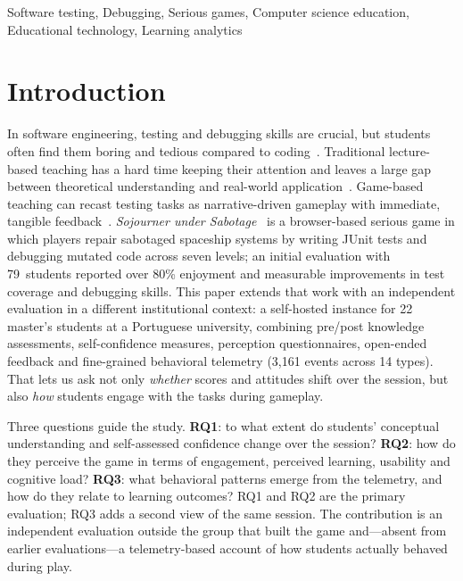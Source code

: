\documentclass[conference]{IEEEtran}
\begin{document}
\begin{IEEEkeywords}
Software testing, Debugging, Serious games, Computer science education, Educational technology, Learning analytics
\end{IEEEkeywords}

\section{Introduction}
\label{sec:intro}
In software engineering, testing and debugging skills are crucial, but students often find them boring and tedious compared to coding~\cite{straubinger2023survey, garousi2020testing}. Traditional lecture-based teaching has a hard time keeping their attention and leaves a large gap between theoretical understanding and real-world application~\cite{mccauley2008debugging}. Game-based teaching can recast testing tasks as narrative-driven gameplay with immediate, tangible feedback~\cite{connolly2012systematic, blanco2023gamification}.
\emph{Sojourner under Sabotage}~\cite{straubinger2025sojourner} is a browser-based serious game in which players repair sabotaged spaceship systems by writing JUnit tests and debugging mutated code across seven levels; an initial evaluation with 79~students reported over 80\% enjoyment and measurable improvements in test coverage and debugging skills.
This paper extends that work with an independent evaluation in a different institutional context: a self-hosted instance for 22 master's students at a Portuguese university, combining pre/post knowledge assessments, self-confidence measures, perception questionnaires, open-ended feedback and fine-grained behavioral telemetry (3,161 events across 14 types). That lets us ask not only \emph{whether} scores and attitudes shift over the session, but also \emph{how} students engage with the tasks during gameplay.

Three questions guide the study. \textbf{RQ1}: to what extent do students' conceptual understanding and self-assessed confidence change over the session? \textbf{RQ2}: how do they perceive the game in terms of engagement, perceived learning, usability and cognitive load? \textbf{RQ3}: what behavioral patterns emerge from the telemetry, and how do they relate to learning outcomes? RQ1 and RQ2 are the primary evaluation; RQ3 adds a second view of the same session.
The contribution is an independent evaluation outside the group that built the game and---absent from earlier evaluations---a telemetry-based account of how students actually behaved during play.
\end{document}
